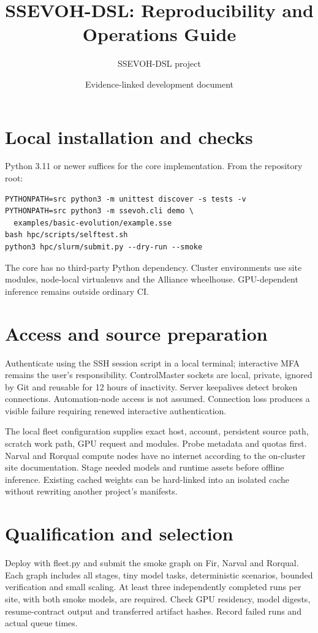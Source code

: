 \documentclass[11pt]{article}
\title{SSEVOH-DSL: Reproducibility and Operations Guide}
\author{SSEVOH-DSL project}
\date{Evidence-linked development document}
\begin{document}
\maketitle

\section{Local installation and checks}
Python 3.11 or newer suffices for the core implementation. From the repository root:
\begin{verbatim}
PYTHONPATH=src python3 -m unittest discover -s tests -v
PYTHONPATH=src python3 -m ssevoh.cli demo \
  examples/basic-evolution/example.sse
bash hpc/scripts/selftest.sh
python3 hpc/slurm/submit.py --dry-run --smoke
\end{verbatim}
The core has no third-party Python dependency. Cluster environments use site modules, node-local virtualenvs and the Alliance wheelhouse. GPU-dependent inference remains outside ordinary CI.

\section{Access and source preparation}
Authenticate using the SSH session script in a local terminal; interactive MFA remains the user's responsibility. ControlMaster sockets are local, private, ignored by Git and reusable for 12 hours of inactivity. Server keepalives detect broken connections. Automation-node access is not assumed. Connection loss produces a visible failure requiring renewed interactive authentication.

The local fleet configuration supplies exact host, account, persistent source path, scratch work path, GPU request and modules. Probe metadata and quotas first. Narval and Rorqual compute nodes have no internet according to the on-cluster site documentation. Stage needed models and runtime assets before offline inference. Existing cached weights can be hard-linked into an isolated cache without rewriting another project's manifests.

\section{Qualification and selection}
Deploy with fleet.py and submit the smoke graph on Fir, Narval and Rorqual. Each graph includes all stages, tiny model tasks, deterministic scenarios, bounded verification and small scaling. At least three independently completed runs per site, with both smoke models, are required. Check GPU residency, model digests, resume-contract output and transferred artifact hashes. Record failed runs and actual queue times.
\end{document}
